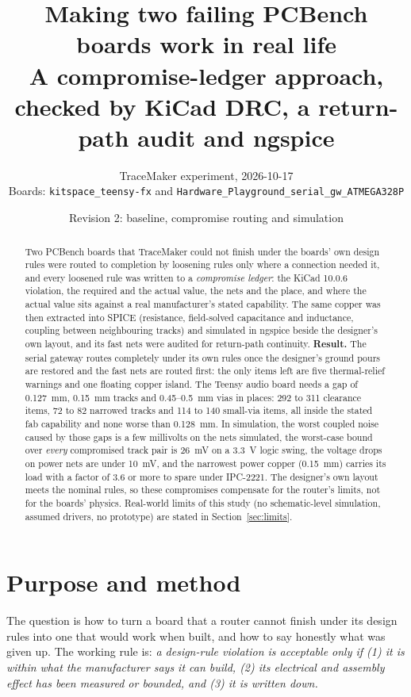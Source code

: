\documentclass[10pt,a4paper]{article}
\title{Making two failing PCBench boards work in real life\\[2pt]\large A compromise-ledger approach, checked by KiCad DRC, a return-path audit and ngspice}
\author{TraceMaker experiment, 2026-10-17\\\small Boards: \texttt{kitspace\_teensy-fx} and \texttt{Hardware\_Playground\_serial\_gw\_ATMEGA328P}}
\date{Revision 2: baseline, compromise routing and simulation}
\begin{document}
\maketitle

\begin{abstract}
\noindent
Two PCBench boards that TraceMaker could not finish under the boards' own design rules were routed to completion by loosening rules only where a connection needed it,
and every loosened rule was written to a \emph{compromise ledger}: the KiCad 10.0.6 violation, the required and the actual value, the nets and the place, and where the actual value
sits against a real manufacturer's stated capability. The same copper was then extracted into SPICE (resistance, field-solved capacitance and inductance, coupling between neighbouring tracks)
and simulated in ngspice beside the designer's own layout, and its fast nets were audited for return-path continuity.
\textbf{Result.} The serial gateway routes completely under its own rules once the designer's ground pours are restored and the fast nets are routed first:
the only items left are five thermal-relief warnings and one floating copper island.
The Teensy audio board needs a gap of 0.127~mm, 0.15~mm tracks and 0.45--0.5~mm vias in places: 292 to 311 clearance items, 72 to 82 narrowed tracks and 114 to 140 small-via items, all inside the stated fab
capability and none worse than 0.128~mm. In simulation, the worst coupled noise caused by those gaps is a few millivolts on the nets simulated, the worst-case bound over \emph{every} compromised track pair is
26~mV on a 3.3~V logic swing, the voltage drops on power nets are under 10~mV, and the narrowest power copper (0.15~mm) carries its load with a factor of 3.6 or more to spare under IPC-2221.
The designer's own layout meets the nominal rules, so these compromises compensate for the router's limits, not for the boards' physics. Real-world limits of this study (no schematic-level simulation, assumed drivers,
no prototype) are stated in Section~\ref{sec:limits}.
\end{abstract}

\tableofcontents
\newpage

\section{Purpose and method}

The question is how to turn a board that a router cannot finish under its design rules into one that would work when built, and how to say honestly what was given up. The working rule is:
\emph{a design-rule violation is acceptable only if (1) it is within what the manufacturer says it can build, (2) its electrical and assembly effect has been measured or bounded, and (3) it is written down.}
\end{document}
